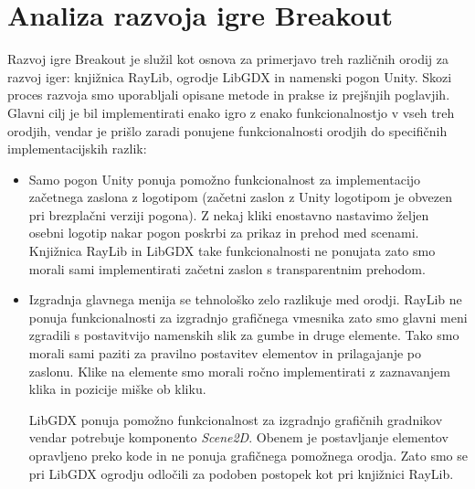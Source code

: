 \documentclass[12pt,a4paper,twoside]{book}
\begin{document}
\chapter{Analiza razvoja igre Breakout}\thispagestyle{fancy}
Razvoj igre Breakout je služil kot osnova za primerjavo treh različnih orodij za razvoj iger: knjižnica RayLib, ogrodje LibGDX in namenski pogon Unity. Skozi proces razvoja smo uporabljali opisane metode in prakse iz prejšnjih poglavjih. Glavni cilj je bil implementirati enako igro z enako funkcionalnostjo v vseh treh orodjih, vendar je prišlo zaradi ponujene funkcionalnosti orodjih do specifičnih implementacijskih razlik:
\begin{itemize}
	\item Samo pogon Unity ponuja pomožno funkcionalnost za implementacijo začetnega zaslona z logotipom (začetni zaslon z Unity logotipom je obvezen pri brezplačni verziji pogona). Z nekaj kliki enostavno nastavimo željen osebni logotip nakar pogon poskrbi za prikaz in prehod med scenami. Knjižnica RayLib in LibGDX take funkcionalnosti ne ponujata zato smo morali sami implementirati začetni zaslon s transparentnim prehodom.
	\item Izgradnja glavnega menija se tehnološko zelo razlikuje med orodji. RayLib ne ponuja funkcionalnosti za izgradnjo grafičnega vmesnika zato smo glavni meni zgradili s postavitvijo namenskih slik za gumbe in druge elemente. Tako smo morali sami paziti za pravilno postavitev elementov in prilagajanje po zaslonu. Klike na elemente smo morali ročno implementirati z zaznavanjem klika in pozicije miške ob kliku.
	
	LibGDX ponuja pomožno funkcionalnost za izgradnjo grafičnih gradnikov vendar potrebuje komponento \textit{Scene2D}. Obenem je postavljanje elementov opravljeno preko kode in ne ponuja grafičnega pomožnega orodja. Zato smo se pri LibGDX ogrodju odločili za podoben postopek kot pri knjižnici RayLib.
	

\end{itemize}
\end{document}
